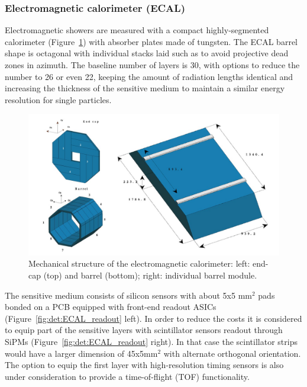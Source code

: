 \subsubsection{Electromagnetic calorimeter (ECAL)}

Electromagnetic showers are measured with a compact highly-segmented calorimeter (Figure~\ref{fig:det:ECAL}) with absorber plates made of tungsten. The ECAL barrel shape is octagonal with individual stacks laid such as to avoid projective dead zones in azimuth. The baseline number of layers is 30, with options to reduce the number to 26 or even 22, keeping the amount of radiation lengths identical and increasing the thickness of the sensitive medium to maintain a similar energy resolution for single particles. 

\begin{figure}[t!]
\centering
\includegraphics[width=1.0\hsize]{Detector/fig/ECAL_structure.jpg}
\caption{Mechanical structure of the electromagnetic calorimeter: left: end-cap (top) and barrel (bottom); right: individual barrel module.}
\label{fig:det:ECAL}
\end{figure}

The sensitive medium consists of silicon sensors with about 5x5 mm$^2$ pads bonded on a PCB equipped with front-end readout ASICs (Figure~\ref{fig:det:ECAL_readout} left). In order to reduce the costs it is considered to equip part of the sensitive layers with scintillator sensors readout through SiPMs (Figure~\ref{fig:det:ECAL_readout} right). In that case the scintillator strips would have a larger dimension of 45x5mm$^2$ with alternate orthogonal orientation. The option to equip the first layer with high-resolution timing sensors is also under consideration to provide a time-of-flight (TOF) functionality.

